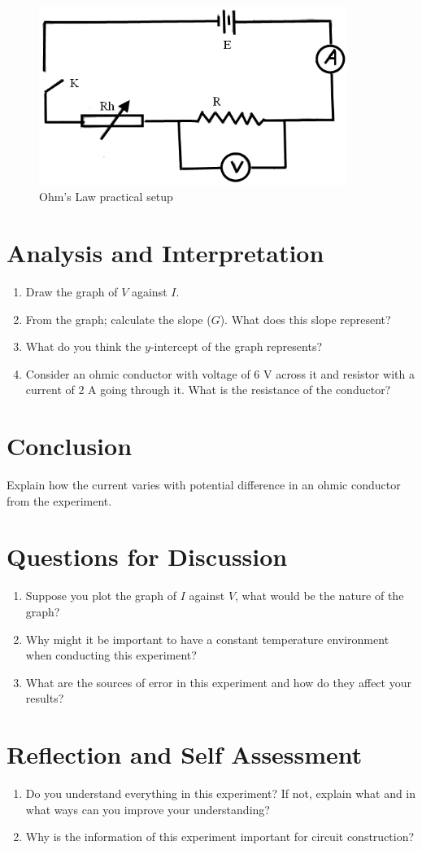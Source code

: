 \begin{figure}[h!]
\centering
\includegraphics[width=10cm]{./img/ohms-law-1.png}
\caption{Ohm's Law practical setup}
\label{fig:ohms-law-1}
\end{figure}

\section{Analysis and Interpretation}
\begin{enumerate}
\item Draw the graph of $V$ against $I$.
\item From the graph; calculate the slope ($G$). What does this slope represent?
\item What do you think the $y$-intercept of the graph represents?
\item Consider an ohmic conductor with voltage of 6 V across it and resistor with a current of 2 A going through it. What is the resistance of the conductor?
\end{enumerate}

\section{Conclusion}
Explain how the current varies with potential difference in an ohmic conductor from the experiment.

\section{Questions for Discussion}
\begin{enumerate}
\item Suppose you plot the graph of $I$ against $V$, what would be the nature of the graph?
\item Why might it be important to have a constant temperature environment when conducting this experiment?
\item What are the sources of error in this experiment and how do they affect your results?
\end{enumerate}

\section{Reflection and Self Assessment}
\begin{enumerate}
\item Do you understand everything in this experiment? If not, explain what and in what ways can you improve your understanding?
\item Why is the information of this experiment important for circuit construction?
\end{enumerate}
